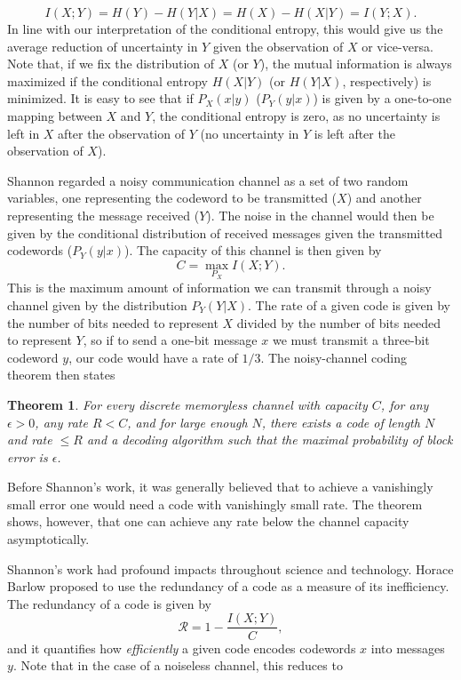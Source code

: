 $$
I(X;Y) = H(Y) - H(Y|X) = H(X) - H(X|Y) = I(Y;X).
$$
In line with our interpretation of the conditional entropy, this would give us the average reduction of uncertainty in $Y$ given the observation of $X$ or vice-versa. Note that, if we fix the distribution of $X$ (or $Y$), the mutual information is always maximized if the conditional entropy $H(X|Y)$ (or $H(Y|X)$, respectively) is minimized. It is easy to see that if $P_X(x|y)$ ($P_Y(y|x)$) is given by a one-to-one mapping between $X$ and $Y$, the conditional entropy is zero, as no uncertainty is left in $X$ after the observation of $Y$ (no uncertainty in $Y$ is left after the observation of $X$).\par
Shannon regarded a noisy communication channel as a set of two random variables, one representing the codeword to be transmitted ($X$) and another representing the message received ($Y$). The noise in the channel would then be given by the conditional distribution of received messages given the transmitted codewords ($P_Y(y|x)$). The capacity of this channel is then given by
$$
C = \max_{P_X} I(X;Y).
$$
This is the maximum amount of information we can transmit through a noisy channel given by the distribution $P_Y(Y|X)$.
The rate of a given code is given by the number of bits needed to represent $X$ divided by the number of bits needed to represent $Y$, so if to send a one-bit message $x$ we must transmit a three-bit codeword $y$, our code would have a rate of $1/3$.
The noisy-channel coding theorem\cite{mackay2003information} then states
\newtheorem{noisychannel}{Theorem}
\begin{noisychannel}
\label{thm:noisychannel}
For every discrete memoryless channel with capacity $C$, for any $\epsilon>0$, any rate $R<C$, and for large enough $N$, there exists a code of length $N$ and rate $\leq R$ and a decoding algorithm such that the maximal probability of block error is $\epsilon$.
\end{noisychannel}
Before Shannon's work, it was generally believed that to achieve a vanishingly small error one would need a code with vanishingly small rate. The theorem shows, however, that one can achieve any rate below the channel capacity asymptotically.\par
Shannon's work had profound impacts throughout science and technology. Horace Barlow proposed to use the redundancy of a code as a measure of its inefficiency. The redundancy of a code is given by
$$
\mathcal{R} = 1 - \frac{I(X;Y)}{C},
$$
and it quantifies how {\em efficiently} a given code encodes codewords $x$ into messages $y$. Note that in the case of a noiseless channel, this reduces to 
